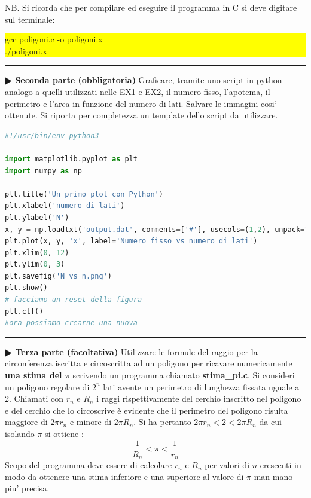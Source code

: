 \documentclass[11pt]{article}
\begin{document}
NB. Si ricorda che per compilare ed eseguire il programma in C si deve digitare sul terminale:

\colorbox{yellow}{\begin{minipage}{17cm}
  gcc poligoni.c -o poligoni.x \\
  ./poligoni.x
\end{minipage}}

\hrule
\vspace{2mm}
\textbf{$\RHD$ Seconda parte (obbligatoria)} 
 Graficare, tramite uno script in python analogo a quelli utilizzati nelle EX1 e EX2, il numero fisso, l'apotema, il perimetro e l'area in funzione del numero di lati. Salvare le immagini cosi` ottenute. Si riporta per completezza un template dello script da utilizzare. 
\begin{lstlisting}[language=Python, caption=Python example]
#!/usr/bin/env python3

import matplotlib.pyplot as plt
import numpy as np

plt.title('Un primo plot con Python')
plt.xlabel('numero di lati')
plt.ylabel('N')
x, y = np.loadtxt('output.dat', comments=['#'], usecols=(1,2), unpack=True)
plt.plot(x, y, 'x', label='Numero fisso vs numero di lati')
plt.xlim(0, 12)
plt.ylim(0, 3)
plt.savefig('N_vs_n.png')
plt.show()
# facciamo un reset della figura
plt.clf()
#ora possiamo crearne una nuova 
\end{lstlisting}
\hrule
\vspace{2mm}
\textbf{$\RHD$ Terza parte (facoltativa)} 
Utilizzare le formule del raggio per la circonferenza iscritta e circoscritta ad un poligono per ricavare numericamente \textbf{una stima del $\pi$} scrivendo un programma chiamato \textbf{stima\_pi.c}. 
Si consideri un poligono regolare di $2^n$ lati avente un perimetro di lunghezza fissata uguale a 2. Chiamati con $r_n$ e $R_n$ i raggi rispettivamente del cerchio inscritto nel poligono e del cerchio che lo circoscrive è evidente che il perimetro del poligono risulta maggiore di $2 \pi r_n$ e minore di $2 \pi R_n$. 
Si ha pertanto $2 \pi r_n < 2<  2\pi R_n$
da cui isolando $\pi$ si ottiene :
$$\frac{1}{R_n} <  \pi < \frac{1}{r_n}$$
Scopo del programma deve essere di calcolare $r_n$ e $R_n$ per valori di $n$ crescenti in modo da ottenere una stima inferiore e una superiore al valore di $\pi$ man mano piu' precisa. 
\end{document}
